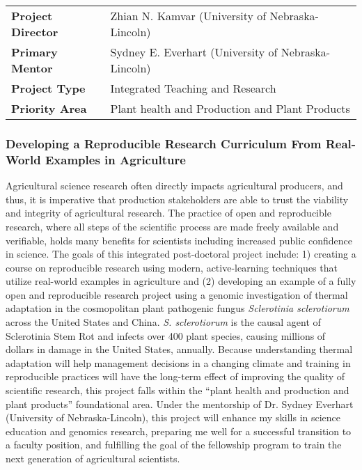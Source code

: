 \documentclass[12pt,letterpaper]{article}
\title{\ruleline{Project Summary}}
\begin{document}
\maketitle

\vspace{2em}

\begin{centering}
\begin{tabular}{ll}
\textbf{Project Director} & Zhian N. Kamvar (University of Nebraska-Lincoln)\\
\textbf{Primary Mentor  } & Sydney E. Everhart (University of Nebraska-Lincoln)\\
\textbf{Project Type    } & Integrated Teaching and Research\\
\textbf{Priority Area   } & Plant health and Production and Plant Products
\end{tabular}
\end{centering}

\vspace{2em}

\subsubsection*{Developing a Reproducible Research Curriculum From Real-World Examples in Agriculture}

Agricultural science research often directly impacts agricultural producers, and thus, it is imperative that production stakeholders are able to trust the viability and integrity of agricultural research. 
The practice of open and reproducible research, where all steps of the scientific process are made freely available and verifiable, holds many benefits for scientists including increased public confidence in science. 
The goals of this integrated post-doctoral project include: 1) creating a course on reproducible research using modern, active-learning techniques that utilize real-world examples in agriculture and (2) developing an example of a fully open and reproducible research project using a genomic investigation of thermal adaptation in the cosmopolitan plant pathogenic fungus \textit{Sclerotinia sclerotiorum} across the United States and China. 
\textit{S. sclerotiorum} is the causal agent of Sclerotinia Stem Rot and infects over 400 plant species, causing millions of dollars in damage in the United States, annually. 
Because understanding thermal adaptation will help management decisions in a changing climate and training in reproducible practices will have the long-term effect of improving the quality of scientific research, this project falls within the ``plant health and production and plant products'' foundational area. 
Under the mentorship of Dr. Sydney Everhart (University of Nebraska-Lincoln), this project will enhance my skills in science education and genomics research, preparing me well for a successful transition to a faculty position, and fulfilling the goal of the fellowship program to train the next generation of agricultural scientists.
\end{document}
